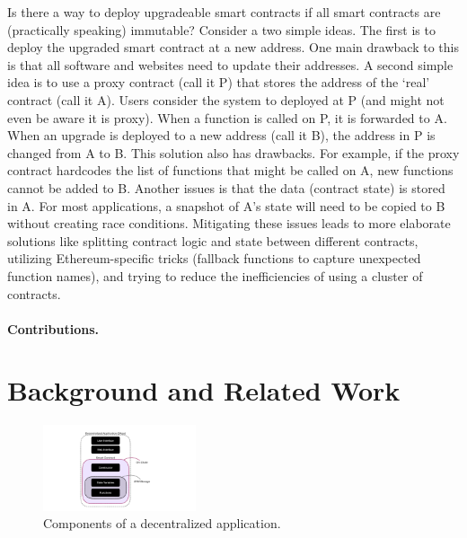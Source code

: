 Is there a way to deploy upgradeable smart contracts if all smart contracts are (practically speaking) immutable? Consider a two simple ideas. The first is to deploy the upgraded smart contract at a new address. One main drawback to this is that all software and websites need to update their addresses. A second simple idea is to use a proxy contract (call it P) that stores the address of the `real' contract (call it A). Users consider the system to deployed at P (and might not even be aware it is proxy). When a function is called on P, it is forwarded to A. When an upgrade is deployed to a new address (call it B), the address in P is changed from A to B. This solution also has drawbacks. For example, if the proxy contract hardcodes the list of functions that might be called on A, new functions cannot be added to B. Another issues is that the data (contract state) is stored in A. For most applications, a snapshot of A's state will need to be copied to B without creating race conditions. Mitigating these issues leads to more elaborate solutions like splitting contract logic and state between different contracts, utilizing Ethereum-specific tricks (fallback functions to capture unexpected function names), and trying to reduce the inefficiencies of using a cluster of contracts.

\paragraph{Contributions.} 



\section{Background and Related Work}

\begin{figure}[t]
  \centering
      \includegraphics[width=0.4\textwidth]{figures/dapp.pdf}
  \caption{Components of a decentralized application.\label{fig:dapp}}
 \end{figure}

